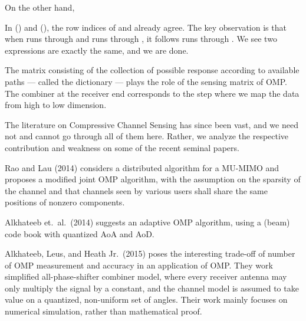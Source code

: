 On the other hand,


In () and (), the row indices of  and  already agree.
The key observation is that when  runs through  and  runs through , it follows  runs through .
We see two expressions are exactly the same, and we are done.

The matrix consisting of the collection of possible response according to available paths --- called the dictionary --- plays the role of the sensing matrix of OMP.
The combiner at the receiver end corresponds to the step where we map the data from high to low dimension.

\stopsection

\startsection [title={Further Development}]

The literature on Compressive Channel Sensing has since been vast, and we need not and cannot go through all of them here.
Rather, we analyze the respective contribution and weakness on some of the recent seminal papers.

Rao and Lau (2014) considers a distributed algorithm for a MU-MIMO and proposes a modified joint OMP algorithm, with the assumption on the sparsity of the channel and that channels seen by various users shall share the same positions of nonzero components.

Alkhateeb et.\ al.\ (2014) suggests an adaptive OMP algorithm, using a (beam) code book with quantized AoA and AoD.

Alkhateeb, Leus, and Heath Jr.\ (2015) poses the interesting trade-off of number of OMP measurement and accuracy in an application of OMP.
They work simplified all-phase-shifter combiner model, where every receiver antenna may only multiply the signal by a constant, and the channel model is assumed to take value on a quantized, non-uniform set of angles.
Their work mainly focuses on numerical simulation, rather than mathematical proof.

